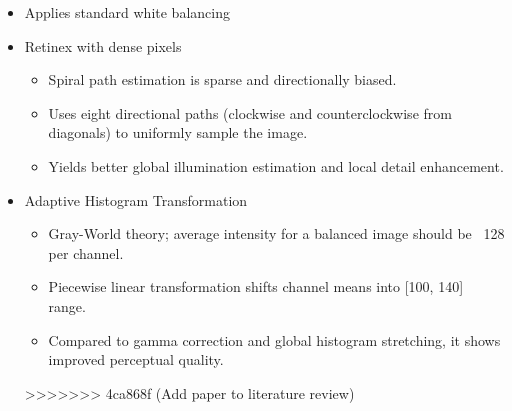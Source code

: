 \documentclass{article}
\begin{document}
\begin{itemize}
    \item Applies standard white balancing
    \item Retinex with dense pixels
          \begin{itemize}
              \item Spiral path estimation is sparse and directionally biased.
              \item Uses eight directional paths (clockwise and counterclockwise from diagonals) to uniformly sample the image.
              \item Yields better global illumination estimation and local detail enhancement.
          \end{itemize}
    \item Adaptive Histogram Transformation
          \begin{itemize}
              \item Gray-World theory; average intensity for a balanced image should be ~128 per channel.
              \item Piecewise linear transformation shifts channel means into [100, 140] range.
              \item Compared to gamma correction and global histogram stretching, it shows improved perceptual quality.
          \end{itemize}
>>>>>>> 4ca868f (Add paper to literature review)
\end{itemize}
\end{document}

